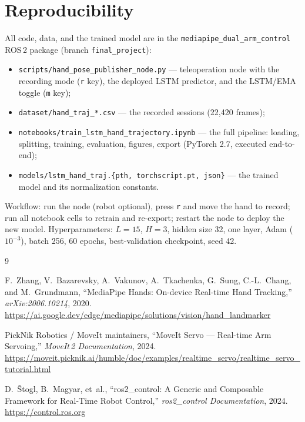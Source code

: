 \documentclass[11pt,a4paper]{article}
\begin{document}
\section{Reproducibility}

All code, data, and the trained model are in the
\texttt{mediapipe\_dual\_arm\_control} ROS\,2 package
(branch \texttt{final\_project}):
\begin{itemize}
  \item \texttt{scripts/hand\_pose\_publisher\_node.py} --- teleoperation node
        with the recording mode (\texttt{r} key), the deployed LSTM predictor,
        and the LSTM/EMA toggle (\texttt{m} key);
  \item \texttt{dataset/hand\_traj\_*.csv} --- the recorded sessions
        (22{,}420 frames);
  \item \texttt{notebooks/train\_lstm\_hand\_trajectory.ipynb} --- the full
        pipeline: loading, splitting, training, evaluation, figures, export
        (PyTorch 2.7, executed end-to-end);
  \item \texttt{models/lstm\_hand\_traj.\{pth, torchscript.pt, json\}} --- the
        trained model and its normalization constants.
\end{itemize}
Workflow: run the node (robot optional), press \texttt{r} and move the hand to
record; run all notebook cells to retrain and re-export; restart the node to
deploy the new model. Hyperparameters: $L{=}15$, $H{=}3$, hidden size 32, one
layer, Adam ($10^{-3}$), batch 256, 60 epochs, best-validation checkpoint,
seed 42.

\begin{thebibliography}{9}

F.~Zhang, V.~Bazarevsky, A.~Vakunov, A.~Tkachenka, G.~Sung, C.-L.~Chang, and
M.~Grundmann, ``MediaPipe Hands: On-device Real-time Hand Tracking,''
\emph{arXiv:2006.10214}, 2020.
\url{https://ai.google.dev/edge/mediapipe/solutions/vision/hand_landmarker}

PickNik Robotics / MoveIt maintainers, ``MoveIt Servo --- Real-time Arm
Servoing,'' \emph{MoveIt\,2 Documentation}, 2024.
\url{https://moveit.picknik.ai/humble/doc/examples/realtime_servo/realtime_servo_tutorial.html}

D.~\v{S}togl, B.~Magyar, et~al., ``ros2\_control: A Generic and Composable
Framework for Real-Time Robot Control,'' \emph{ros2\_control Documentation},
2024. \url{https://control.ros.org}

\end{thebibliography}
\end{document}
